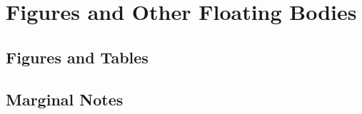 \section{Figures and Other Floating Bodies}
\subsection{Figures and Tables}


\subsection{Marginal Notes}
\newpage